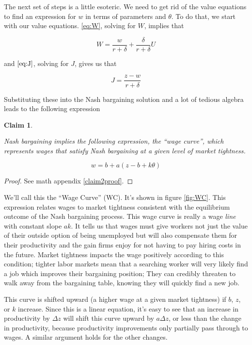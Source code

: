 \documentclass[12pt]{article}
\newtheorem{theorem}{Claim}
\begin{document}
The next set of steps is a little esoteric. We need to get rid of the value equations to find an expression for $w$ in terms of parameters and $\theta$.  To do that, we start with our value equations. \eqref{eq:W}, solving for $W$, implies that

$$ W = \frac{w}{r + \delta} + \frac{\delta}{r + \delta} U $$

and $\eqref{eq:J}$, solving for $J$, gives us that

$$ J = \frac{z - w}{r + \delta} $$

Substituting these into the Nash bargaining solution and a lot of tedious algebra leads to the following expression

\begin{theorem}\label{claim2}

Nash bargaining implies the following expression, the ``wage curve'', which represents wages that satisfy Nash bargaining at a given level of market tightness.

\begin{equation}\label{eq:WC}
	w = b + a (z - b +  k \theta) \tag{WC}
\end{equation}

\end{theorem}
\begin{proof}
See math appendix \ref{claim2proof}.
\end{proof}


We'll call this the ``Wage Curve'' (WC).  It's shown in figure \ref{fig:WC}. This expression relates wages to market tightness consistent with the equilibrium outcome of the Nash bargaining process.  This wage curve is really a wage \textit{line} with constant slope $a k$.  It tells us that wages must give workers not just the value of their outside option of being unemployed but will also compensate them for their productivity and the gain firms enjoy for not having to pay hiring costs in the future.  Market tightness impacts the wage positively according to this condition; tighter labor markets mean that a searching worker will very likely find a job which improves their bargaining position; They can credibly threaten to walk away from the bargaining table, knowing they will quickly find a new job.

This curve is shifted upward (a higher wage at a given market tightness) if $b$, $z$, or $k$ increase.  Since this is a linear equation, it's easy to see that an increase in productivity by $\Delta z$ will shift this curve upward by $a \Delta z$, or less than the change in productivity, because productivity improvements only partially pass through to wages. A similar argument holds for the other changes.  
\end{document}
